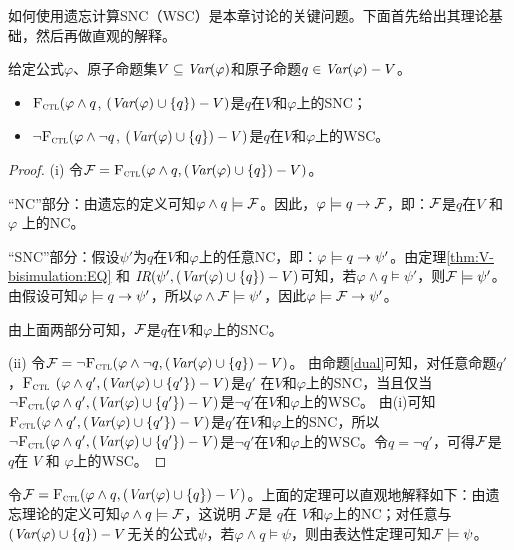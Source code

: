 如何使用遗忘计算SNC（WSC）是本章讨论的关键问题。下面首先给出其理论基础，然后再做直观的解释。


\begin{theorem}\label{thm:SNC:WSC:forget}
	给定公式$\varphi$、原子命题集$V\subseteq\textit{Var}(\varphi)$和原子命题$q\in\textit{Var}(\varphi)- V$。
	\begin{itemize}
		\item[(i)] ${\textsc{F}_{\textsc{ctl}}} (\varphi \land q$, $(\textit{Var}(\varphi) \cup \{q\}) - V)$是$q$在$V$和$\varphi$上的SNC；
		\item[(ii)]  $\neg{\textsc{F}_{\textsc{ctl}}} (\varphi \land \neg q$, $(\textit{Var}(\varphi) \cup \{q\}) - V)$是$q$在$V$和$\varphi$上的WSC。
	\end{itemize}
\end{theorem}
\begin{proof}
	(i) 令${\cal F}={\textsc{F}_{\textsc{ctl}}}(\varphi \wedge q, (\textit{Var}(\varphi) \cup \{q\})- V)$。
	
	
	“NC”部分：由遗忘的定义可知$\varphi \wedge q \models {\cal F}$。因此，$\varphi\models q \rightarrow {\cal F}$，即：${\cal F}$是$q$在$V$ 和$\varphi$ 上的NC。
	
	“SNC”部分：假设$\psi'$为$q$在$V$和$\varphi$上的任意NC，即：$\varphi\models q \rightarrow \psi'$。由定理\ref{thm:V-bisimulation:EQ} 和 $\emph{IR}(\psi', (\textit{Var}(\varphi) \cup \{q\})- V)$可知，若$\varphi \wedge q \models \psi'$，则${\cal F} \models \psi'$。
	由假设可知$\varphi\models q \rightarrow \psi'$，所以$\varphi \wedge {\cal F} \models \psi'$，因此$\varphi \models {\cal F} \rightarrow \psi'$。
	
	由上面两部分可知，${\cal F}$是$q$在$V$和$\varphi$上的SNC。
	
	(ii) 令${\cal F}=\neg {\textsc{F}_{\textsc{ctl}}}(\varphi \wedge \neg q, (\textit{Var}(\varphi) \cup \{q\})- V)$。
	由命题\ref{dual}可知，对任意命题$q'$，${\textsc{F}_{\textsc{ctl}}}$ $(\varphi \wedge q', (\textit{Var}(\varphi) \cup \{q'\})- V)$是$q'$ 在$V$和$\varphi$上的SNC，当且仅当
	$\neg {\textsc{F}_{\textsc{ctl}}}(\varphi \wedge q', (\textit{Var}(\varphi) \cup \{q'\})- V)$是$\neg q'$在$V$和$\varphi$上的WSC。
	由(i)可知${\textsc{F}_{\textsc{ctl}}}(\varphi \wedge q', (\textit{Var}(\varphi) \cup \{q'\})- V)$是$q'$在$V$和$\varphi$上的SNC，所以$\neg {\textsc{F}_{\textsc{ctl}}}(\varphi \wedge q', (\textit{Var}(\varphi) \cup \{q'\})- V)$是$\neg q'$在$V$和$\varphi$上的WSC。令$q=\neg q'$，可得${\cal F}$是 $q$在 $V$ 和 $\varphi$上的WSC。
\end{proof}

令${\cal F}={\textsc{F}_{\textsc{ctl}}}(\varphi \wedge q, (\textit{Var}(\varphi) \cup \{q\})- V)$。上面的定理可以直观地解释如下：由遗忘理论的定义可知$\varphi \wedge q \models {\cal F}$，这说明
${\cal F}$是 $q$在 $V$和$\varphi$上的NC；对任意与$(\textit{Var}(\varphi) \cup \{q\})- V$无关的公式$\psi$，若$\varphi \wedge q \models \psi$，则由表达性定理可知${\cal F} \models \psi$。


